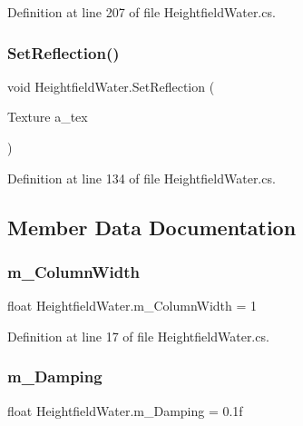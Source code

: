 Definition at line 207 of file Heightfield\+Water.\+cs.

\mbox{\label{class_heightfield_water_a905688cd369050cdbeb2c836e5a5d681}} 
\subsubsection{\texorpdfstring{Set\+Reflection()}{SetReflection()}}
{\footnotesize\ttfamily void Heightfield\+Water.\+Set\+Reflection (\begin{DoxyParamCaption}\item[{Texture}]{a\+\_\+tex }\end{DoxyParamCaption})}



Definition at line 134 of file Heightfield\+Water.\+cs.



\subsection{Member Data Documentation}
\mbox{\label{class_heightfield_water_a7a6722aa643d9ff2c73c8a3f4bd6683e}} 
\subsubsection{\texorpdfstring{m\+\_\+\+Column\+Width}{m\_ColumnWidth}}
{\footnotesize\ttfamily float Heightfield\+Water.\+m\+\_\+\+Column\+Width = 1}



Definition at line 17 of file Heightfield\+Water.\+cs.

\mbox{\label{class_heightfield_water_ad8074687483ebbcaa4d64ab87b10f22a}} 
\subsubsection{\texorpdfstring{m\+\_\+\+Damping}{m\_Damping}}
{\footnotesize\ttfamily float Heightfield\+Water.\+m\+\_\+\+Damping = 0.\+1f}



